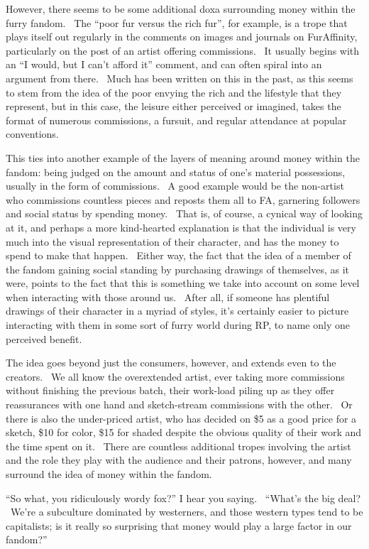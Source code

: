 However, there seems to be some additional doxa surrounding money within
the furry fandom. ~The ``poor fur versus the rich fur'', for example, is
a trope that plays itself out regularly in the comments on images and
journals on FurAffinity, particularly on the post of an artist offering
commissions. ~It usually begins with an ``I would, but I can't afford
it'' comment, and can often spiral into an argument from there. ~Much
has been written on this in the past, as this seems to stem from the
idea of the poor envying the rich and the lifestyle that they represent,
but in this case, the leisure either perceived or imagined, takes the
format of numerous commissions, a fursuit, and regular attendance at
popular conventions.

This ties into another example of the layers of meaning around money
within the fandom: being judged on the amount and status of one's
material possessions, usually in the form of commissions. ~A good
example would be the non-artist who commissions countless pieces and
reposts them all to FA, garnering followers and social status by
spending money. ~That is, of course, a cynical way of looking at it, and
perhaps a more kind-hearted explanation is that the individual is very
much into the visual representation of their character, and has the
money to spend to make that happen. ~Either way, the fact that the idea
of a member of the fandom gaining social standing by purchasing drawings
of themselves, as it were, points to the fact that this is something we
take into account on some level when interacting with those around us.
~After all, if someone has plentiful drawings of their character in a
myriad of styles, it's certainly easier to picture interacting with them
in some sort of furry world during RP, to name only one perceived
benefit.

The idea goes beyond just the consumers, however, and extends even to
the creators. ~We all know the overextended artist, ever taking more
commissions without finishing the previous batch, their work-load piling
up as they offer reassurances with one hand and sketch-stream
commissions with the other. ~Or there is also the under-priced artist,
who has decided on \$5 as a good price for a sketch, \$10 for color,
\$15 for shaded despite the obvious quality of their work and the time
spent on it. ~There are countless additional tropes involving the artist
and the role they play with the audience and their patrons, however, and
many surround the idea of money within the fandom.

``So what, you ridiculously wordy fox?'' I hear you saying. ~``What's
the big deal? ~We're a subculture dominated by westerners, and those
western types tend to be capitalists; is it really so surprising that
money would play a large factor in our fandom?''

